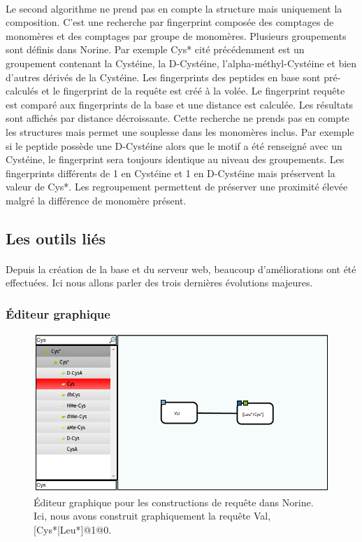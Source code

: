 \documentclass[12pt,french,twoside]{report}
\begin{document}
\paragraph{}Le second algorithme ne prend pas en compte la structure mais uniquement la composition.
C'est une recherche par fingerprint composée des comptages de monomères et des comptages par groupe de monomères.
Plusieurs groupements sont définis dans Norine.
Par exemple Cys* cité précédemment est un groupement contenant la Cystéine, la D-Cystéine, l'alpha-méthyl-Cystéine et bien d'autres dérivés de la Cystéine.
Les fingerprints des peptides en base sont pré-calculés et le fingerprint de la requête est créé à la volée.
Le fingerprint requête est comparé aux fingerprints de la base et une distance est calculée.
Les résultats sont affichés par distance décroissante.
Cette recherche ne prends pas en compte les structures mais permet une souplesse dans les monomères inclus.
Par exemple si le peptide possède une D-Cystéine alors que le motif a été renseigné avec un Cystéine, le fingerprint sera toujours identique au niveau des groupements.
Les fingerprints différents de 1 en Cystéine et 1 en D-Cystéine mais préservent la valeur de Cys*.
Les regroupement permettent de préserver une proximité élevée malgré la différence de monomère présent.



\subsection{Les outils liés}

\paragraph{}Depuis la création de la base et du serveur web, beaucoup d'améliorations ont été effectuées.
Ici nous allons parler des trois dernières évolutions majeures.


\subsubsection{Éditeur graphique}

\begin{figure}[h!]
  \begin{center}
    \includegraphics[width=450px]{Figures/Norine/editor.png}
    \caption{\label{editor}Éditeur graphique pour les constructions de requête dans Norine.
    Ici, nous avons construit graphiquement la requête Val,[Cys*|Leu*]@1@0.}
  \end{center}
\end{figure}
\end{document}
